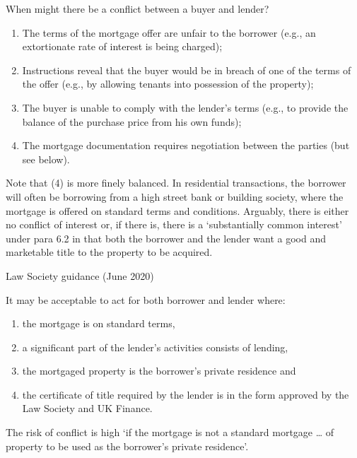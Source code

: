 \documentclass[
]{article}
\providecommand{\tightlist}{%
  \setlength{\itemsep}{0pt}\setlength{\parskip}{0pt}}
\newenvironment{env-785438bb-4d67-4370-80ef-9aa959fc6b60}
{
    \savenotes\tcolorbox[blanker,breakable,left=5pt,borderline west={2pt}{-4pt}{darkred}]
}
{
    \endtcolorbox\spewnotes
}
\newenvironment{env-d6ce83a0-f7a8-46b6-be95-b1235f1feb63}
{
    \savenotes\tcolorbox[blanker,breakable,left=5pt,borderline west={2pt}{-4pt}{gray}]
}
{
    \endtcolorbox\spewnotes
}
\begin{document}
\begin{env-d6ce83a0-f7a8-46b6-be95-b1235f1feb63}

When might there be a conflict between a buyer and lender?

\begin{enumerate}
\tightlist
\item
  The terms of the mortgage offer are unfair to the borrower (e.g., an
  extortionate rate of interest is being charged);
\item
  Instructions reveal that the buyer would be in breach of one of the
  terms of the offer (e.g., by allowing tenants into possession of the
  property);
\item
  The buyer is unable to comply with the lender's terms (e.g., to
  provide the balance of the purchase price from his own funds);
\item
  The mortgage documentation requires negotiation between the parties
  (but see below).
\end{enumerate}

\end{env-d6ce83a0-f7a8-46b6-be95-b1235f1feb63}

Note that (4) is more finely balanced. In residential transactions, the
borrower will often be borrowing from a high street bank or building
society, where the mortgage is offered on standard terms and conditions.
Arguably, there is either no conflict of interest or, if there is, there
is a `substantially common interest' under para 6.2 in that both the
borrower and the lender want a good and marketable title to the property
to be acquired.

\begin{env-785438bb-4d67-4370-80ef-9aa959fc6b60}

Law Society guidance (June 2020)

It may be acceptable to act for both borrower and lender where:

\begin{enumerate}
\tightlist
\item
  the mortgage is on standard terms,
\item
  a significant part of the lender's activities consists of lending,
\item
  the mortgaged property is the borrower's private residence and
\item
  the certificate of title required by the lender is in the form
  approved by the Law Society and UK Finance.
\end{enumerate}

The risk of conflict is high `if the mortgage is not a standard mortgage
\ldots{} of property to be used as the borrower's private residence'.

\end{env-785438bb-4d67-4370-80ef-9aa959fc6b60}
\end{document}
